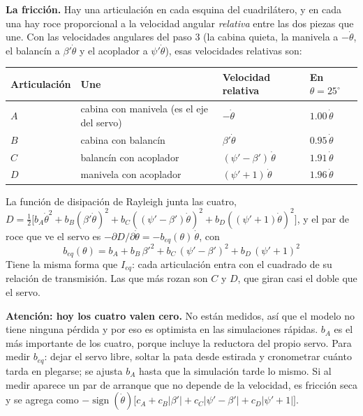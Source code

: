 \documentclass[11pt,a4paper]{article}
\begin{document}
\textbf{La fricción.} Hay una articulación en cada esquina del cuadrilátero, y en cada una hay roce
proporcional a la velocidad angular \emph{relativa} entre las dos piezas que une. Con las velocidades
angulares del paso 3 (la cabina quieta, la manivela a \(-\dot\theta\), el balancín a \(\beta'\dot\theta\) y el
acoplador a \(\psi'\dot\theta\)), esas velocidades relativas son:
\begin{center}\small
\begin{tabular}{llll}
\toprule
Articulación & Une & Velocidad relativa & En \(\theta=25^\circ\) \\
\midrule
\(A\) & cabina con manivela (es el eje del servo) & \(-\dot\theta\) & \(1.00\,\dot\theta\) \\
\(B\) & cabina con balancín & \(\beta'\dot\theta\) & \(0.95\,\dot\theta\) \\
\(C\) & balancín con acoplador & \((\psi'-\beta')\,\dot\theta\) & \(1.91\,\dot\theta\) \\
\(D\) & manivela con acoplador & \((\psi'+1)\,\dot\theta\) & \(1.96\,\dot\theta\) \\
\bottomrule
\end{tabular}
\end{center}
La función de disipación de Rayleigh junta las cuatro,
\(D=\tfrac12\bigl[b_A\dot\theta^2+b_B(\beta'\dot\theta)^2+b_C((\psi'-\beta')\dot\theta)^2+b_D((\psi'+1)\dot\theta)^2\bigr]\),
y el par de roce que ve el servo es \(-\partial D/\partial\dot\theta=-b_{eq}(\theta)\,\dot\theta\), con
\begin{equation}
\boxed{\;b_{eq}(\theta)=b_A+b_B\,\beta'^2+b_C\,(\psi'-\beta')^2+b_D\,(\psi'+1)^2\;}
\label{eq:beq}
\end{equation}
Tiene la misma forma que \(I_{eq}\): cada articulación entra con el cuadrado de su relación de transmisión.
Las que más rozan son \(C\) y \(D\), que giran casi el doble que el servo.

\textbf{Atención: hoy los cuatro valen cero.} No están medidos, así que el modelo no tiene ninguna pérdida y
por eso es optimista en las simulaciones rápidas. \(b_A\) es el más importante de los cuatro, porque incluye
la reductora del propio servo. Para medir \(b_{eq}\): dejar el servo libre, soltar la pata desde estirada y
cronometrar cuánto tarda en plegarse; se ajusta \(b_A\) hasta que la simulación tarde lo mismo. Si al medir
aparece un par de arranque que no depende de la velocidad, es fricción seca y se agrega como
\(-\operatorname{sign}(\dot\theta)\bigl[c_A+c_B|\beta'|+c_C|\psi'-\beta'|+c_D|\psi'+1|\bigr]\).
\end{document}
